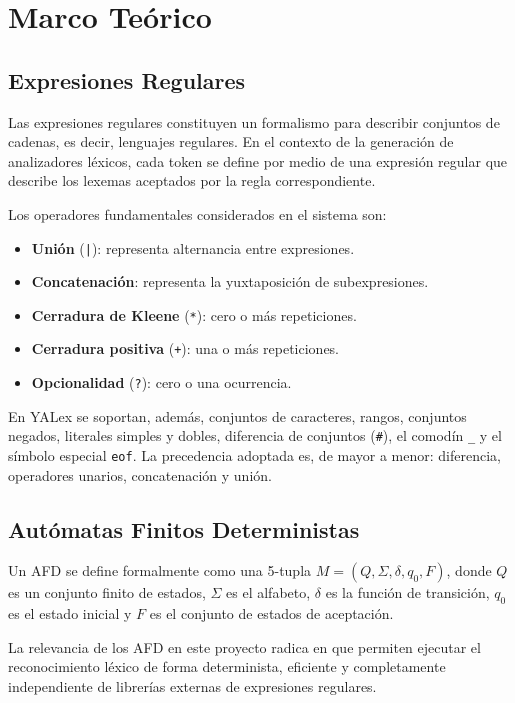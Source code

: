 \documentclass[12pt,a4paper]{article}
\begin{document}
\section{Marco Teórico}

\subsection{Expresiones Regulares}

Las expresiones regulares constituyen un formalismo para describir conjuntos de cadenas, es decir, lenguajes regulares. En el contexto de la generación de analizadores léxicos, cada token se define por medio de una expresión regular que describe los lexemas aceptados por la regla correspondiente.

Los operadores fundamentales considerados en el sistema son:

\begin{itemize}[leftmargin=2em]
  \item \textbf{Unión} (\texttt{|}): representa alternancia entre expresiones.
  \item \textbf{Concatenación}: representa la yuxtaposición de subexpresiones.
  \item \textbf{Cerradura de Kleene} (\texttt{*}): cero o más repeticiones.
  \item \textbf{Cerradura positiva} (\texttt{+}): una o más repeticiones.
  \item \textbf{Opcionalidad} (\texttt{?}): cero o una ocurrencia.
\end{itemize}

En YALex se soportan, además, conjuntos de caracteres, rangos, conjuntos negados, literales simples y dobles, diferencia de conjuntos (\texttt{\#}), el comodín \texttt{\_} y el símbolo especial \texttt{eof}. La precedencia adoptada es, de mayor a menor: diferencia, operadores unarios, concatenación y unión.

\subsection{Autómatas Finitos Deterministas}

Un AFD se define formalmente como una 5-tupla $M = (Q, \Sigma, \delta, q_0, F)$, donde $Q$ es un conjunto finito de estados, $\Sigma$ es el alfabeto, $\delta$ es la función de transición, $q_0$ es el estado inicial y $F$ es el conjunto de estados de aceptación.

La relevancia de los AFD en este proyecto radica en que permiten ejecutar el reconocimiento léxico de forma determinista, eficiente y completamente independiente de librerías externas de expresiones regulares.
\end{document}
